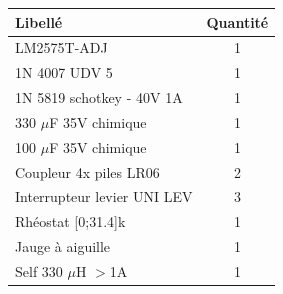 \documentclass[12pt]{article}
\begin{document}
\begin{center}
	\begin{tabular}{|l|c|}
		\hline
		Libellé				& Quantité	\\ \hline
		LM2575T-ADJ			& 1		\\
		1N 4007 UDV 5			& 1		\\
		1N 5819 schotkey - 40V 1A	& 1		\\
		330 $\mu$F 35V chimique		& 1		\\
		100 $\mu$F 35V chimique		& 1		\\
		Coupleur 4x piles LR06		& 2		\\
		Interrupteur levier UNI LEV	& 3		\\
		Rhéostat [0;31.4]k\footnotemark	& 1		\\
		Jauge à aiguille		& 1		\\
		Self 330 $\mu$H $>$1A		& 1		\\
		\hline
	\end{tabular}
\end{center}
\end{document}
